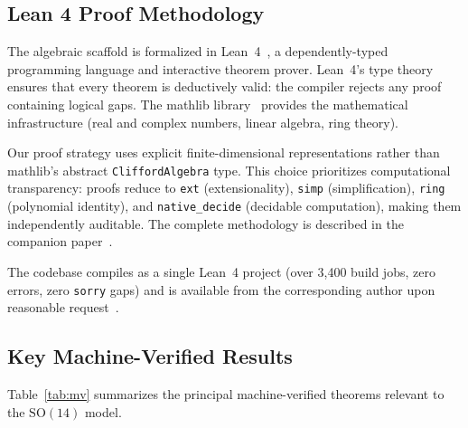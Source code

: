 \documentclass[aps,prd,twocolumn,showpacs,preprintnumbers,superscriptaddress,floatfix]{revtex4-2}
\begin{document}
\subsection{Lean 4 Proof Methodology}

The algebraic scaffold is formalized in Lean~4~\cite{demoura2021lean4},
a dependently-typed programming language and interactive theorem prover.
Lean~4's type theory ensures that every theorem is deductively valid:
the compiler rejects any proof containing logical gaps.  The mathlib
library~\cite{mathlib} provides the mathematical infrastructure (real
and complex numbers, linear algebra, ring theory).

Our proof strategy uses explicit finite-dimensional representations
rather than mathlib's abstract \texttt{CliffordAlgebra} type.  This
choice prioritizes computational transparency: proofs reduce to
\texttt{ext} (extensionality), \texttt{simp} (simplification),
\texttt{ring} (polynomial identity), and \texttt{native\_decide}
(decidable computation), making them independently auditable.
The complete methodology is described in the companion
paper~\cite{arnoldy2026cicm}.

The codebase compiles as a single Lean~4 project (over 3,400 build jobs,
zero errors, zero \texttt{sorry} gaps) and is available
from the corresponding author upon reasonable request~\cite{uft-github}.

\subsection{Key Machine-Verified Results}

Table~\ref{tab:mv} summarizes the principal machine-verified theorems
relevant to the $\mathrm{SO}(14)$ model.
\end{document}
